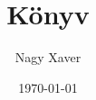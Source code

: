 \documentclass{book}
\begin{document}
\title{Könyv}
\author{Nagy Xaver}
\date{\today}
\hulipsum
\end{document}
